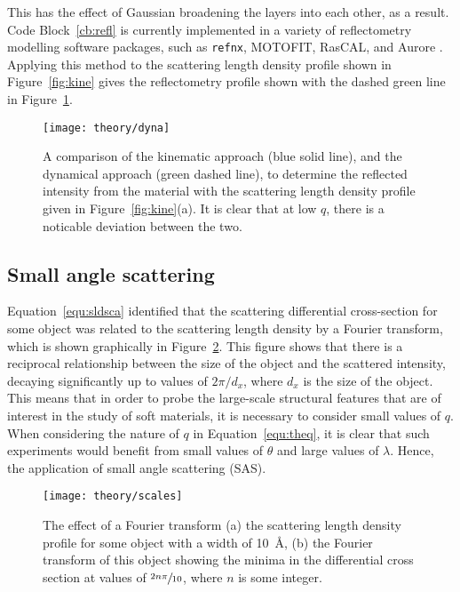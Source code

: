 This has the effect of Gaussian broadening the layers into each other, as a result. Code Block~\ref{cb:refl} is currently implemented in a variety of reflectometry modelling software packages, such as \texttt{refnx}, MOTOFIT, RasCAL, and Aurore \cite{nelson_refnx_2019,nelson_co-refinement_2006,hughes_rascal_nodate,gerelli_aurore_2016-1,gerelli_aurore_2016}.
Applying this method to the scattering length density profile shown in Figure~\ref{fig:kine} gives the reflectometry profile shown with the dashed green line in Figure~\ref{fig:dyna}.
%
\begin{figure}
    \centering
        
\end{figure}
%
%
\begin{figure}
    \centering
    \texttt{[image: theory/dyna]}
    \caption{A comparison of the kinematic approach (blue solid line), and the dynamical approach (green dashed line), to determine the reflected intensity from the material with the scattering length density profile given in Figure~\ref{fig:kine}(a). It is clear that at low $q$, there is a noticable deviation between the two.}
    \label{fig:dyna}
\end{figure}
%


\subsection{Small angle scattering}

Equation~\ref{equ:sldsca} identified that the scattering differential cross-section for some object was related to the scattering length density by a Fourier transform, which is shown graphically in Figure~\ref{fig:scales}.
This figure shows that there is a reciprocal relationship between the size of the object and the scattered intensity, decaying significantly up to values of $2\pi/d_x$, where $d_x$ is the size of the object.
This means that in order to probe the large-scale structural features that are of interest in the study of soft materials, it is necessary to consider small values of $q$.
When considering the nature of $q$ in Equation~\ref{equ:theq}, it is clear that such experiments would benefit from small values of $\theta$ and large values of $\lambda$.
Hence, the application of small angle scattering (SAS).
%
\begin{figure}
    \centering
    \texttt{[image: theory/scales]}
    \caption{The effect of a Fourier transform (a) the scattering length density profile for some object with a width of \SI{10}{\angstrom}, (b) the Fourier transform of this object showing the minima in the differential cross section at values of $\sfrac{2n\pi}{10}$, where $n$ is some integer.}
    \label{fig:scales}
\end{figure}
%


